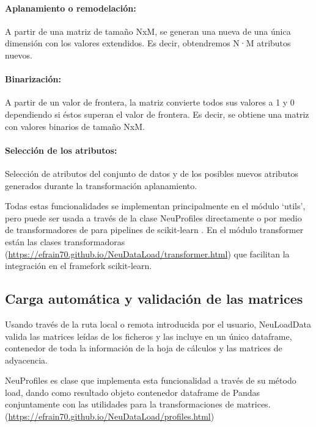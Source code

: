 \paragraph{Aplanamiento o remodelación:}
A partir de una matriz de tamaño NxM, se generan una nueva de una única dimensión con los valores extendidos. Es decir, obtendremos N·M atributos nuevos.

\paragraph{Binarización:} A partir de un valor de frontera, la matriz convierte todos sus valores a 1 y 0 dependiendo si éstos superan el valor de frontera. Es decir, se obtiene una matriz con valores binarios de tamaño NxM.

\paragraph{Selección de los atributos:} Selección de atributos del conjunto de datos y de los posibles nuevos atributos generados durante la transformación aplanamiento. 

Todas estas funcionalidades se implementan principalmente en el módulo ‘utils’, pero puede ser usada a través de la clase NeuProfiles directamente o por medio de transformadores de para pipelines de scikit-learn \cite{Scikit-learn:Documentation}. En el módulo transformer están las clases transformadoras (\url{https://efrain70.github.io/NeuDataLoad/transformer.html}) que facilitan la integración en el framefork scikit-learn.

\subsection{Carga automática y validación de las matrices}
Usando través de la ruta local o remota introducida por el usuario, NeuLoadData valida las matrices leídas de los ficheros y las incluye en un único dataframe, contenedor de toda la información de la hoja de cálculos y las matrices de adyacencia.

NeuProfiles es clase que implementa esta funcionalidad a través de su método load, dando como resultado objeto contenedor dataframe de Pandas \cite{PythonLibrary} conjuntamente con las utilidades para la transformaciones de matrices. (\url{https://efrain70.github.io/NeuDataLoad/profiles.html})

